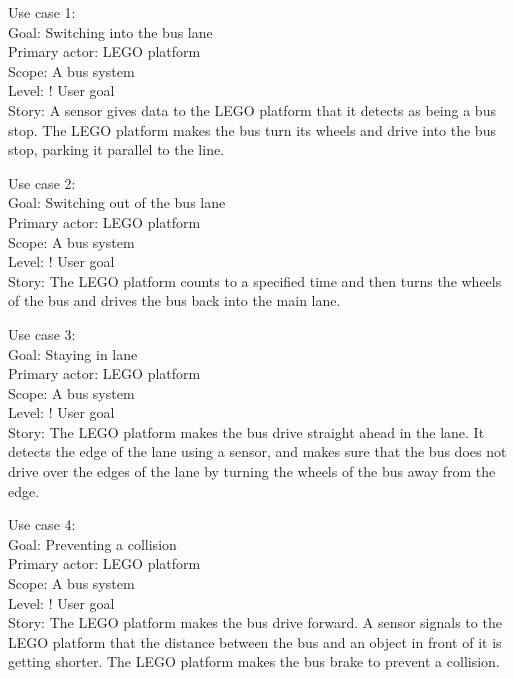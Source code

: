 

Use case 1:\\
Goal: Switching into the bus lane\\
Primary actor: LEGO platform\\
Scope: A bus system\\
Level: ! User goal\\
Story: A sensor gives data to the LEGO platform that it detects as being a bus stop. The LEGO platform makes the bus turn its wheels and drive into the bus stop, parking it parallel to the line.

Use case 2:\\
Goal: Switching out of the bus lane\\
Primary actor: LEGO platform\\
Scope: A bus system\\
Level: ! User goal\\
Story: The LEGO platform counts to a specified time and then turns the wheels of the bus and drives the bus back into the main lane.

Use case 3:\\
Goal: Staying in lane\\
Primary actor: LEGO platform\\
Scope: A bus system\\
Level: ! User goal\\
Story: The LEGO platform makes the bus drive straight ahead in the lane. It detects the edge of the lane using a sensor, and makes sure that the bus does not drive over the edges of the lane by turning the wheels of the bus away from the edge.

Use case 4:\\
Goal: Preventing a collision\\
Primary actor: LEGO platform\\
Scope: A bus system\\
Level: ! User goal\\
Story: The LEGO platform makes the bus drive forward. A sensor signals to the LEGO platform that the distance between the bus and an object in front of it is getting shorter. The LEGO platform makes the bus brake to prevent a collision.


